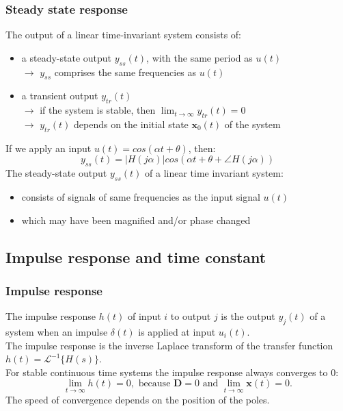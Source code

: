 \begin{frame}
\frametitle{Steady state response}
The output of a linear time-invariant system consists of:
\begin{itemize}
\item a steady-state output $y_{ss}(t)$, with the same period as $u(t)$ \\
$\rightarrow$ $y_{ss}$ comprises the same frequencies as $u(t)$ \\
\item a transient output $y_{tr}(t)$ \\
$\rightarrow$ if the system is stable, then $\lim_{t\rightarrow\infty} y_{tr}(t) = 0$  \\
$\rightarrow$ $y_{tr}(t)$ depends on the initial state $\mathbf{x}_0(t)$ of the system
\end{itemize}
If we apply an input $u(t) = cos(\alpha t + \theta)$, then:
\begin{equation*}
y_{ss}(t) = |H(j\alpha)|cos(\alpha t + \theta + \angle H(j\alpha))
\end{equation*}
The steady-state output $y_{ss}(t)$ of a linear time invariant system:
\begin{itemize}
\item consists of signals of same frequencies as the input signal $u(t)$
\item which may have been magnified and/or phase changed
\end{itemize}
\end{frame}

\subsection{Impulse response and time constant}

\begin{frame}
\frametitle{Impulse response}
The impulse response $h(t)$ of input $i$ to output $j$ is the output $y_j(t)$ of a system when an impulse $\delta(t)$ is applied at input $u_i(t)$.\\
The impulse response is the inverse Laplace transform of the transfer function $h(t) = \mathcal{L}^{-1}\{H(s)\}$.\\ 
For stable continuous time systems the impulse response always converges to $0$:
\begin{equation*}
\lim_{t\rightarrow\infty} h(t) = 0, \text{ because } \mathbf{D}=0 \text{ and }\lim_{t\rightarrow\infty} \mathbf{x}(t) = 0.
\end{equation*}
The speed of convergence depends on the position of the poles.
\end{frame}

